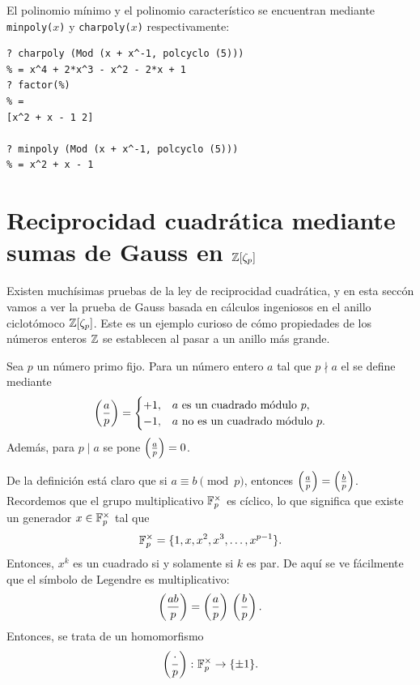 El polinomio mínimo y el polinomio característico se encuentran mediante
\texttt{minpoly($x$)} y \texttt{charpoly($x$)} respectivamente:
\begin{shaded}
\begin{verbatim}
? charpoly (Mod (x + x^-1, polcyclo (5)))
% = x^4 + 2*x^3 - x^2 - 2*x + 1
? factor(%)
% = 
[x^2 + x - 1 2]

? minpoly (Mod (x + x^-1, polcyclo (5)))
% = x^2 + x - 1
\end{verbatim}
\end{shaded}


\section{Reciprocidad cuadrática mediante sumas de Gauss en \texorpdfstring{$\mathbb{Z} [\zeta_p]$}{ℤ[ζₚ]}}
\label{sec:reciprocidad-cuadratica}


Existen muchísimas pruebas de la ley de reciprocidad cuadrática, y en esta
seccón vamos a ver la prueba de Gauss basada en cálculos ingeniosos en el anillo
ciclotómoco $\mathbb{Z} [\zeta_p]$. Este es un ejemplo curioso de cómo propiedades
de los números enteros $\mathbb{Z}$ se establecen al pasar a un anillo más grande.

\begin{definicion}
  Sea $p$ un número primo fijo. Para un número entero $a$ tal que $p\nmid a$
  el  se define mediante
  \[ \left(\frac{a}{p}\right) = \begin{cases}
    +1, & a\text{ es un cuadrado módulo }p,\\
    -1, & a\text{ no es un cuadrado módulo }p.
  \end{cases} \]
  Además, para $p \mid a$ se pone $\left(\frac{a}{p}\right) = 0$.
\end{definicion}

De la definición está claro que si $a \equiv b \pmod{p}$, entonces
$\left(\frac{a}{p}\right) = \left(\frac{b}{p}\right)$. Recordemos que el grupo multiplicativo
$\mathbb{F}_p^\times$ es cíclico, lo que significa que existe un generador
$x\in \mathbb{F}_p^\times$ tal que
$$\mathbb{F}_p^\times = \{ 1, x, x^2, x^3, \ldots, x^{p-1} \}.$$
Entonces, $x^k$ es un cuadrado si y solamente si $k$ es par.
De aquí se ve fácilmente que el símbolo de Legendre es multiplicativo:
$$\left(\frac{ab}{p}\right) = \left(\frac{a}{p}\right)\,\left(\frac{b}{p}\right).$$
Entonces, se trata de un homomorfismo
$$\left(\frac{\cdot}{p}\right)\colon \mathbb{F}_p^\times \to \{ \pm 1 \}.$$


